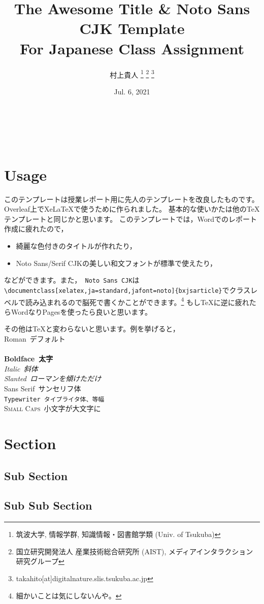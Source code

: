 \documentclass[xelatex,ja=standard,jafont=noto]{bxjsarticle}
\title{\blueb\gtfamily\mdseries\upshape\rmfamily\textsf{The Awesome Title \& Noto Sans CJK Template\\ \Large For Japanese Class Assignment}}
\author{\gtfamily 村上貴人
\thanks{筑波大学, 情報学群, 知識情報・図書館学類 (Univ. of Tsukuba)} 
\thanks{国立研究開発法人 産業技術総合研究所 (AIST),  メディアインタラクション研究グループ} 
\thanks{takahito[at]digitalnature.slis.tsukuba.ac.jp} }
\date{\textsf{Jul. 6, 2021}}
\begin{document}
\maketitle
\thispagestyle{fancy} %
\ \\\\
\section{Usage}
このテンプレートは授業レポート用に先人のテンプレートを改良したものです。Overleaf上でXeLa\TeX で使うために作られました。
基本的な使いかたは他の\TeX テンプレートと同じかと思います。
このテンプレートでは，Wordでのレポート作成に疲れたので，
\begin{itemize}
    \item 綺麗な色付きのタイトルが作れたり，
    \item Noto Sans/Serif CJKの美しい和文フォントが標準で使えたり，
\end{itemize}
などができます。また，\verb+ Noto Sans CJK+は\verb+\documentclass[xelatex,ja=standard,jafont=noto]{bxjsarticle}+でクラスレベルで読み込まれるので脳死で書くかことができます。\footnote{細かいことは気にしないんや。}
もし\TeX に逆に疲れたらWordなりPagesを使ったら良いと思います。


その他は\TeX と変わらないと思います。例を挙げると，\\
\textrm{Roman\ デフォルト} \\
 \\
\textbf{Boldface\ 太字} \\
\textit{Italic\ 斜体} \\
\textsl{Slanted\ ローマンを傾けただけ} \\
\textsf{Sans Serif\ サンセリフ体} \\
\texttt{Typewriter\ タイプライタ体、等幅} \\
\textsc{Small Caps\ 小文字が大文字に} \\

\section{Section}
\subsection{Sub Section}
\subsection{Sub Sub Section}
\end{document}
